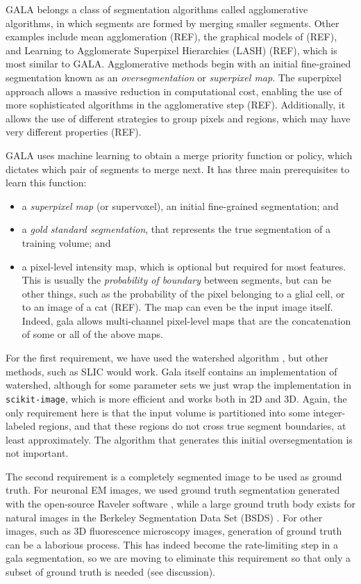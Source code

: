 \documentclass{frontiersSCNS} %
\begin{document}
GALA belongs a class of segmentation algorithms called agglomerative algorithms, in which segments are formed by merging smaller segments.
Other examples include mean agglomeration (REF), the graphical models of (REF), and Learning to Agglomerate Superpixel Hierarchies (LASH) (REF), which is most similar to GALA.
Agglomerative methods begin with an initial fine-grained segmentation known as an \emph{oversegmentation} or \emph{superpixel map}.
The superpixel approach allows a massive reduction in computational cost, enabling the use of more sophisticated algorithms in the agglomerative step (REF).
Additionally, it allows the use of different strategies to group pixels and regions, which may have very different properties (REF).

GALA uses machine learning to obtain a merge priority function or policy, which dictates which pair of segments to merge next.
It has three main prerequisites to learn this function:
\begin{itemize}
\item a \emph{superpixel map} (or supervoxel), an initial fine-grained segmentation; and
\item a \emph{gold standard segmentation}, that represents the true segmentation of a training volume; and
\item a pixel-level intensity map, which is optional but required for most features.
    This is usually the \emph{probability of boundary} between segments, but can be other things, such as the probability of the pixel belonging to a glial cell, or to an image of a cat (REF). The map can even be the input image itself.
    Indeed, gala allows multi-channel pixel-level maps that are the concatenation of some or all of the above maps.
\end{itemize}

For the first requirement, we have used the watershed algorithm \citep{Vincent:1991}, but other methods, such as SLIC \citep{Achanta:2012wc} would work.
Gala itself contains an implementation of watershed, although for some parameter sets we just wrap the implementation in \texttt{\small scikit-image}, which is more efficient and works both in 2D and 3D.
Again, the only requirement here is that the input volume is partitioned into some integer-labeled regions, and that these regions do not cross true segment boundaries, at least approximately.
The algorithm that generates this initial oversegmentation is not important.

The second requirement is a completely segmented image to be used as ground truth.
For neuronal EM images, we used ground truth segmentation generated with the open-source Raveler software \citep{raveler}, while a large ground truth body exists for natural images in the Berkeley Segmentation Data Set (BSDS) \citep{MartinFTM01}.
For other images, such as 3D fluorescence microscopy images, generation of ground truth can be a laborious process.
This has indeed become the rate-limiting step in a gala segmentation, so we are moving to eliminate this requirement so that only a subset of ground truth is needed (see discussion).
\end{document}
